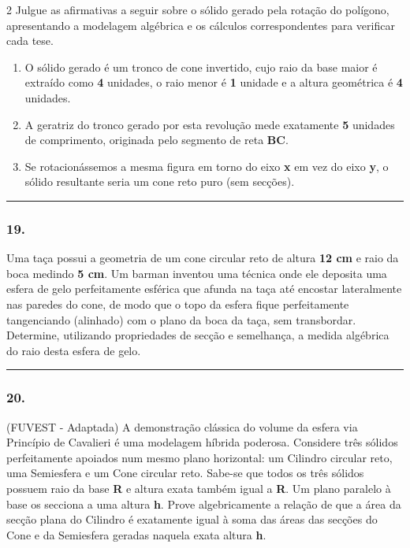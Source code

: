 \documentclass[twoside, 10pt, a4paper]{article}
\newlength{\espacoPreQuestao}\setlength{\espacoPreQuestao}{0.1cm}
\newlength{\espacoQuestao}\setlength{\espacoQuestao}{0.2cm}
\newlength{\espacoAlt}\setlength{\espacoAlt}{0.2cm}
\begin{document}
\begin{multicols*}{2}
Julgue as afirmativas a seguir sobre o sólido gerado pela rotação do polígono, apresentando a modelagem algébrica e os cálculos correspondentes para verificar cada tese.

\begin{enumerate}[label=\Roman*., itemsep=\espacoAlt]
\item O sólido gerado é um tronco de cone invertido, cujo raio da base maior é extraído como \textbf{4} unidades, o raio menor é \textbf{1} unidade e a altura geométrica é \textbf{4} unidades.
\item A geratriz do tronco gerado por esta revolução mede exatamente \textbf{5} unidades de comprimento, originada pelo segmento de reta \textbf{BC}.
\item Se rotacionássemos a mesma figura em torno do eixo \textbf{x} em vez do eixo \textbf{y}, o sólido resultante seria um cone reto puro (sem secções).
\end{enumerate}
\par\vspace{\espacoQuestao}

\noindent\textcolor{CorLinha}{\rule{\linewidth}{0.5pt}} 
\par\vspace{\espacoPreQuestao}
\subsubsection*{19.} Uma taça possui a geometria de um cone circular reto de altura \textbf{12 cm} e raio da boca medindo \textbf{5 cm}. Um barman inventou uma técnica onde ele deposita uma esfera de gelo perfeitamente esférica que afunda na taça até encostar lateralmente nas paredes do cone, de modo que o topo da esfera fique perfeitamente tangenciando (alinhado) com o plano da boca da taça, sem transbordar. Determine, utilizando propriedades de secção e semelhança, a medida algébrica do raio desta esfera de gelo.
\par\vspace{\espacoQuestao}

\noindent\textcolor{CorLinha}{\rule{\linewidth}{0.5pt}} 
\par\vspace{\espacoPreQuestao}
\subsubsection*{20.} (FUVEST - Adaptada) A demonstração clássica do volume da esfera via Princípio de Cavalieri é uma modelagem híbrida poderosa. Considere três sólidos perfeitamente apoiados num mesmo plano horizontal: um Cilindro circular reto, uma Semiesfera e um Cone circular reto. Sabe-se que todos os três sólidos possuem raio da base \textbf{R} e altura exata também igual a \textbf{R}. Um plano paralelo à base os secciona a uma altura \textbf{h}. Prove algebricamente a relação de que a área da secção plana do Cilindro é exatamente igual à soma das áreas das secções do Cone e da Semiesfera geradas naquela exata altura \textbf{h}.
\par\vspace{\espacoQuestao}

\end{multicols*}
\end{document}
